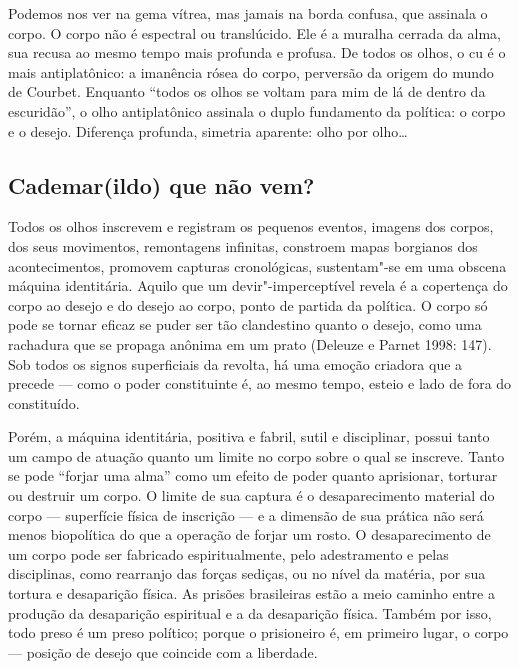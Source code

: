 Podemos nos ver na gema vítrea, mas jamais na borda confusa, que
assinala o corpo. O corpo não é espectral ou translúcido. Ele é a
muralha cerrada da alma, sua recusa ao mesmo tempo mais profunda e
profusa. De todos os olhos, o cu é o mais antiplatônico: a imanência
rósea do corpo, perversão da origem do mundo de Courbet. Enquanto
``todos os olhos se voltam para mim de lá de dentro da escuridão'', o
olho antiplatônico assinala o duplo fundamento da política: o corpo e o
desejo. Diferença profunda, simetria aparente: olho por olho\ldots{}

\subsection{Cademar(ildo) que não vem?}

Todos os olhos inscrevem e
registram os pequenos eventos, imagens dos corpos, dos seus movimentos,
remontagens infinitas, constroem mapas borgianos dos acontecimentos,
promovem capturas cronológicas, sustentam"-se em uma obscena máquina
identitária. Aquilo que um devir"-imperceptível revela é a copertença do
corpo ao desejo e do desejo ao corpo, ponto de partida da política. O
corpo só pode se tornar eficaz se puder ser tão clandestino quanto o
desejo, como uma rachadura que se propaga anônima em um prato (Deleuze e
Parnet 1998: 147). Sob todos os signos superficiais da revolta, há uma
emoção criadora que a precede --- como o poder constituinte é, ao mesmo
tempo, esteio e lado de fora do constituído.

Porém, a máquina identitária, positiva e fabril, sutil e disciplinar,
possui tanto um campo de atuação quanto um limite no corpo sobre o qual
se inscreve. Tanto se pode ``forjar uma alma'' como um efeito de poder
quanto aprisionar, torturar ou destruir um corpo. O limite de sua
captura é o desaparecimento material do corpo --- superfície física de
inscrição --- e a dimensão de sua prática não será menos biopolítica do
que a operação de forjar um rosto. O desaparecimento de um corpo pode
ser fabricado espiritualmente, pelo adestramento e pelas disciplinas,
como rearranjo das forças sediças, ou no nível da matéria, por sua
tortura e desaparição física. As prisões brasileiras estão a meio
caminho entre a produção da desaparição espiritual e a da desaparição
física. Também por isso, todo preso é um preso político; porque o
prisioneiro é, em primeiro lugar, o corpo --- posição de desejo que
coincide com a liberdade.

